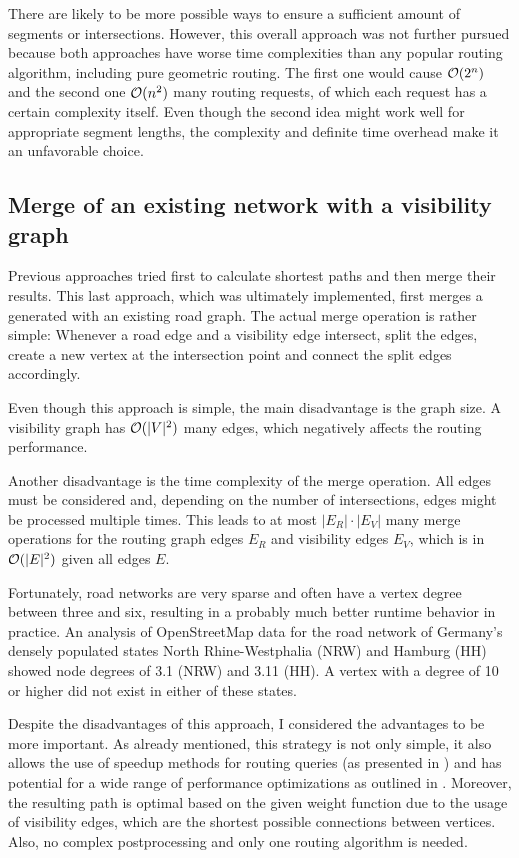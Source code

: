 		There are likely to be more possible ways to ensure a sufficient amount of segments or intersections.
		However, this overall approach was not further pursued because both approaches have worse time complexities than any popular routing algorithm, including pure geometric routing.
		The first one would cause $\mathcal{O}(2^n)$ and the second one $\mathcal{O}(n^2)$ many routing requests, of which each request has a certain complexity itself.
		Even though the second idea might work well for appropriate segment lengths, the complexity and definite time overhead make it an unfavorable choice.
	
	\subsection{Merge of an existing network with a visibility graph}
	\label{subsec:design-merge-road-network}
	
		Previous approaches tried first to calculate shortest paths and then merge their results.
		This last approach, which was ultimately implemented, first merges a generated  with an existing road graph.
		The actual merge operation is rather simple:
		Whenever a road edge and a visibility edge intersect, split the edges, create a new vertex at the intersection point and connect the split edges accordingly.
		
		Even though this approach is simple, the main disadvantage is the graph size.
		A visibility graph has $\mathcal{O}(|V|^2)$ many edges, which negatively affects the routing performance.
		
		Another disadvantage is the time complexity of the merge operation.
		All edges must be considered and, depending on the number of intersections, edges might be processed multiple times.
		This leads to at most $|E_R| \cdot |E_V|$ many merge operations for the routing graph edges $E_R$ and visibility edges $E_V$, which is in $\mathcal{O}(|E|^2)$ given all edges $E$.
		
		Fortunately, road networks are very sparse and often have a vertex degree between three and six\cite{zhao-analysis-osm-bejing}\cite{boeing-osmnx}, resulting in a probably much better runtime behavior in practice.
		An analysis of OpenStreetMap data for the road network of Germany's densely populated states North Rhine-Westphalia (NRW) and Hamburg (HH) showed node degrees of 3.1 (NRW) and 3.11 (HH).
		A vertex with a degree of 10 or higher did not exist in either of these states.
		
		Despite the disadvantages of this approach, I considered the advantages to be more important.
		As already mentioned, this strategy is not only simple, it also allows the use of speedup methods for routing queries (as presented in ) and has potential for a wide range of performance optimizations as outlined in .
		Moreover, the resulting path is optimal based on the given weight function due to the usage of visibility edges, which are the shortest possible connections between vertices. 
		Also, no complex postprocessing and only one routing algorithm is needed.
		
